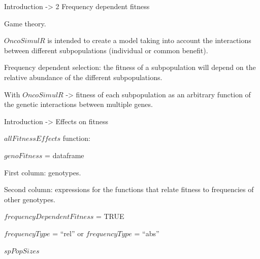 \begin{frame}{Introduction -> 2 Frequency dependent fitness}

    \begin{itemize1}    
        \item Game theory.
        \item $OncoSimulR$ is intended to create a model taking into account the interactions between different subpopulations (individual or common benefit).
        \item Frequency dependent selection: the fitness of a subpopulation will depend on the relative abundance of the different subpopulations.
        \item With $OncoSimulR$ -> fitness of each subpopulation as an arbitrary function of the genetic interactions between multiple genes.       
    \end{itemize1}
    
\end{frame}

\begin{frame}{Introduction -> Effects on fitness}

    \begin{itemize1}
        \item $allFitnessEffects$ function:
        \begin{itemize2}
            \item $genoFitness$ = dataframe
            \begin{itemize3}
                \item First column: genotypes.
                \item Second column: expressions for the functions that relate fitness to frequencies of other genotypes.
            \end{itemize3}
            \item $frequencyDependentFitness$ = TRUE
            \item $frequencyType$ = “rel” or $frequencyType$ = “abs”
            \item $spPopSizes$
        \end{itemize2}        
    \end{itemize1}

\end{frame}

